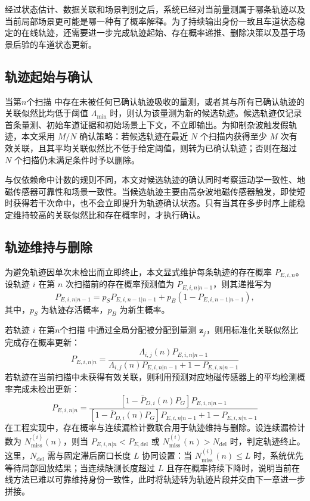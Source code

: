 \documentclass{xdupgthesis}
\begin{document}
经过状态估计、数据关联和场景判别之后，系统已经对当前量测属于哪条轨迹以及当前局部场景更可能是哪一种有了概率解释。为了持续输出身份一致且车道状态稳定的在线轨迹，还需要进一步完成轨迹起始、存在概率递推、删除决策以及基于场景后验的车道状态更新。


\subsection{轨迹起始与确认}

当第$n$个扫描 中存在未被任何已确认轨迹吸收的量测，或者其与所有已确认轨迹的关联似然比均低于阈值 $\Lambda_{\min}$ 时，则认为该量测为新的候选轨迹。候选轨迹仅记录首条量测、初始车道证据和初始场景上下文，不立即输出。为抑制杂波触发假轨迹，本文采用 $M/N$ 确认策略：若候选轨迹在最近 $N$ 个扫描内获得至少 $M$ 次有效关联，且其平均关联似然比不低于给定阈值，则转为已确认轨迹；否则在超过 $N$ 个扫描仍未满足条件时予以删除。

与仅依赖命中计数的规则不同，本文对候选轨迹的确认同时考察运动学一致性、地磁传感器可靠性和场景一致性。当候选轨迹主要由高杂波地磁传感器触发，即使短时获得若干次命中，也不会立即提升为轨迹确认状态。只有当其在多步时序上能稳定维持较高的关联似然比和存在概率时，才执行确认。

\subsection{轨迹维持与删除}

为避免轨迹因单次未检出而立即终止，本文显式维护每条轨迹的存在概率 $P_{E,i,n}$。设轨迹 $i$ 在第 $n$ 次扫描前的存在概率预测值为 $P_{E,i,n|n-1}$，则其递推写为
\begin{equation}
	P_{E,i,n|n-1}=p_S P_{E,i,n-1|n-1}+p_B\left(1-P_{E,i,n-1|n-1}\right),
	\label{eq:ch3_exist_predict_v2}
\end{equation}
其中，$p_S$ 为轨迹存活概率，$p_B$ 为新生概率。

若轨迹 $i$ 在第$n$个扫描 中通过全局分配被分配到量测 $\mathbf z_j$，则用标准化关联似然比完成存在概率更新：
\begin{equation}
	P_{E,i,n|n}=
	\frac{\Lambda_{i,j}(n)P_{E,i,n|n-1}}{\Lambda_{i,j}(n)P_{E,i,n|n-1}+1-P_{E,i,n|n-1}}
	\label{eq:ch3_exist_hit_v2}
\end{equation}
若轨迹在当前扫描中未获得有效关联，则利用预测对应地磁传感器上的平均检测概率完成未检出更新：
\begin{equation}
	P_{E,i,n|n}=
	\frac{\left[1-\bar P_{D,i}(n)P_G\right]P_{E,i,n|n-1}}{\left[1-\bar P_{D,i}(n)P_G\right]P_{E,i,n|n-1}+1-P_{E,i,n|n-1}}
	\label{eq:ch3_exist_miss_v2}
\end{equation}
在工程实现中，存在概率与连续漏检计数联合用于轨迹维持与删除。设连续漏检计数为 $N_{\mathrm{miss}}^{(i)}(n)$，则当 $P_{E,i,n|n} < P_{E,\mathrm{del}}$ 或 $N_{\mathrm{miss}}^{(i)}(n) > N_{\mathrm{del}}$ 时，判定轨迹终止。这里，$N_{\mathrm{del}}$ 需与固定滞后窗口长度 $L$ 协同设置：当 $N_{\mathrm{miss}}^{(i)}(n)\le L$ 时，系统优先等待局部回放结果；当连续缺测长度超过 $L$ 且存在概率持续下降时，说明当前在线方法已难以可靠维持身份一致性，此时将轨迹转为轨迹片段并交由下一章进一步拼接。
\end{document}
